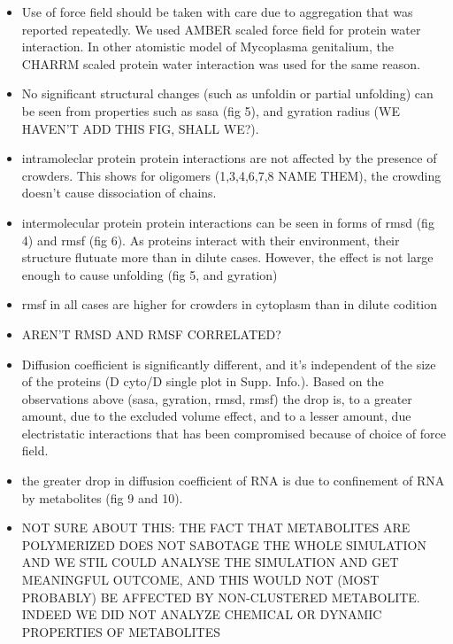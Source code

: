 \documentclass[journal=jacsat,manuscript=article]{achemso}
\begin{document}
 \begin{itemize}
  \item Use of force field should be taken with care due to aggregation that was reported repeatedly. We used AMBER scaled force field for protein water interaction. In other atomistic model of Mycoplasma genitalium, the CHARRM scaled protein water interaction was used for the same reason.
  \item No significant structural changes (such as unfoldin or partial unfolding) can be seen from properties such as sasa (fig 5), and gyration radius  (WE HAVEN'T ADD THIS FIG, SHALL WE?).
  \item intramoleclar protein protein interactions are not affected by the presence of crowders. This shows for oligomers (1,3,4,6,7,8 NAME THEM), the crowding doesn't cause dissociation of chains. 
  \item  intermolecular protein protein interactions can be seen in forms of  rmsd (fig 4) and rmsf (fig 6). As proteins interact with their environment, their structure flutuate more than in dilute cases. However, the effect is not large enough to cause unfolding (fig 5, and gyration)
  \item rmsf in all cases are higher for crowders in cytoplasm than in dilute codition
  \item AREN'T RMSD AND RMSF CORRELATED? 
  \item Diffusion coefficient is significantly different, and it's independent of the size of the proteins (D cyto/D single plot in Supp. Info.). Based on the observations above (sasa, gyration, rmsd, rmsf) the drop is, to a greater amount, due to the excluded volume effect, and to a lesser amount, due electristatic interactions that has been compromised because of choice of force field. 
  \item the greater drop in diffusion coefficient of RNA is due to confinement of RNA by metabolites (fig 9 and 10).
  \item NOT SURE ABOUT THIS: THE FACT THAT METABOLITES ARE POLYMERIZED DOES NOT SABOTAGE THE WHOLE SIMULATION AND WE STIL COULD ANALYSE THE SIMULATION AND GET MEANINGFUL OUTCOME, AND THIS WOULD NOT (MOST PROBABLY) BE AFFECTED BY NON-CLUSTERED METABOLITE. INDEED WE DID NOT ANALYZE CHEMICAL OR DYNAMIC PROPERTIES OF METABOLITES
 \end{itemize}


 
\end{document}
